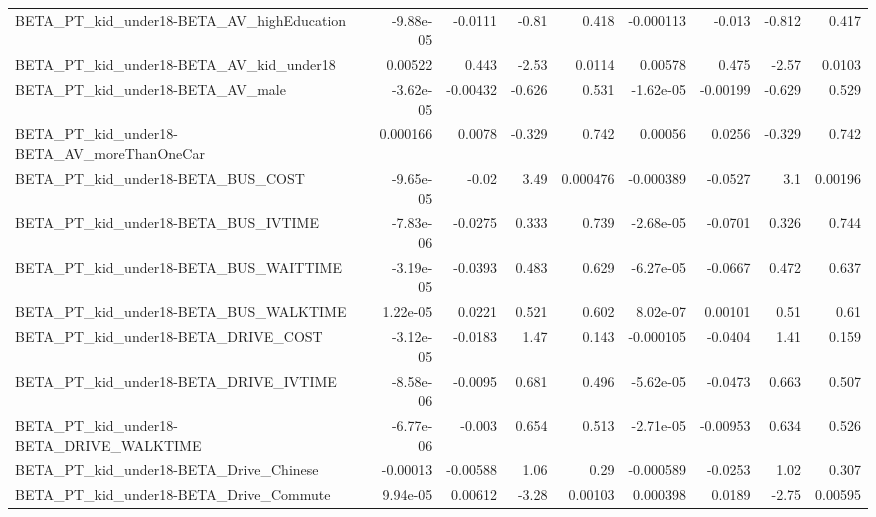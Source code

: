 \begin{tabular}{lrrrrrrrr}
BETA\_PT\_kid\_under18-BETA\_AV\_highEducation          &   -9.88e-05 &      -0.0111 &    -0.81 &    0.418 &  -0.000113 &      -0.013 &       -0.812 &         0.417 \\
BETA\_PT\_kid\_under18-BETA\_AV\_kid\_under18            &     0.00522 &        0.443 &    -2.53 &   0.0114 &    0.00578 &       0.475 &        -2.57 &        0.0103 \\
BETA\_PT\_kid\_under18-BETA\_AV\_male                   &   -3.62e-05 &     -0.00432 &   -0.626 &    0.531 &  -1.62e-05 &    -0.00199 &       -0.629 &         0.529 \\
BETA\_PT\_kid\_under18-BETA\_AV\_moreThanOneCar         &    0.000166 &       0.0078 &   -0.329 &    0.742 &    0.00056 &      0.0256 &       -0.329 &         0.742 \\
BETA\_PT\_kid\_under18-BETA\_BUS\_COST                  &   -9.65e-05 &        -0.02 &     3.49 & 0.000476 &  -0.000389 &     -0.0527 &          3.1 &       0.00196 \\
BETA\_PT\_kid\_under18-BETA\_BUS\_IVTIME                &   -7.83e-06 &      -0.0275 &    0.333 &    0.739 &  -2.68e-05 &     -0.0701 &        0.326 &         0.744 \\
BETA\_PT\_kid\_under18-BETA\_BUS\_WAITTIME              &   -3.19e-05 &      -0.0393 &    0.483 &    0.629 &  -6.27e-05 &     -0.0667 &        0.472 &         0.637 \\
BETA\_PT\_kid\_under18-BETA\_BUS\_WALKTIME              &    1.22e-05 &       0.0221 &    0.521 &    0.602 &   8.02e-07 &     0.00101 &         0.51 &          0.61 \\
BETA\_PT\_kid\_under18-BETA\_DRIVE\_COST                &   -3.12e-05 &      -0.0183 &     1.47 &    0.143 &  -0.000105 &     -0.0404 &         1.41 &         0.159 \\
BETA\_PT\_kid\_under18-BETA\_DRIVE\_IVTIME              &   -8.58e-06 &      -0.0095 &    0.681 &    0.496 &  -5.62e-05 &     -0.0473 &        0.663 &         0.507 \\
BETA\_PT\_kid\_under18-BETA\_DRIVE\_WALKTIME            &   -6.77e-06 &       -0.003 &    0.654 &    0.513 &  -2.71e-05 &    -0.00953 &        0.634 &         0.526 \\
BETA\_PT\_kid\_under18-BETA\_Drive\_Chinese             &    -0.00013 &     -0.00588 &     1.06 &     0.29 &  -0.000589 &     -0.0253 &         1.02 &         0.307 \\
BETA\_PT\_kid\_under18-BETA\_Drive\_Commute             &    9.94e-05 &      0.00612 &    -3.28 &  0.00103 &   0.000398 &      0.0189 &        -2.75 &       0.00595 \\

\end{tabular}
